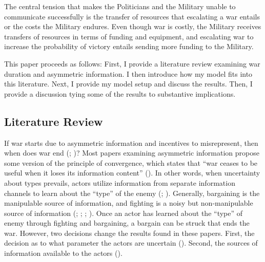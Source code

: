 \documentclass[
  12pt,
]{article}
\theoremstyle{plain}
\theoremstyle{plain}
\theoremstyle{remark}
\begin{document}
The central tension that makes the Politicians and the Military unable
to communicate successfully is the transfer of resources that escalating
a war entails or the costs the Military endures. Even though war is
costly, the Military receives transfers of resources in terms of funding
and equipment, and escalating war to increase the probability of victory
entails sending more funding to the Military.

This paper proceeds as follows: First, I provide a literature review
examining war duration and asymmetric information. I then introduce how
my model fits into this literature. Next, I provide my model setup and
discuss the results. Then, I provide a discussion tying some of the
results to substantive implications.

\subsection{Literature Review}\label{literature-review}

If war starts due to asymmetric information and incentives to
misrepresent, then when does war end
(;
)? Most papers
examining asymmetric information propose some version of the principle
of convergence, which states that ``war ceases to be useful when it
loses its information content''
(). In other words, when uncertainty about types prevails, actors
utilize information from separate information channels to learn about
the ``type'' of the enemy
(; ). Generally, bargaining is the manipulable source of information,
and fighting is a noisy but non-manipulable source of information
(; ;
;
). Once an actor has
learned about the ``type'' of enemy through fighting and bargaining, a
bargain can be struck that ends the war. However, two decisions change
the results found in these papers. First, the decision as to what
parameter the actors are uncertain
().
Second, the sources of information available to the actors
().
\end{document}

